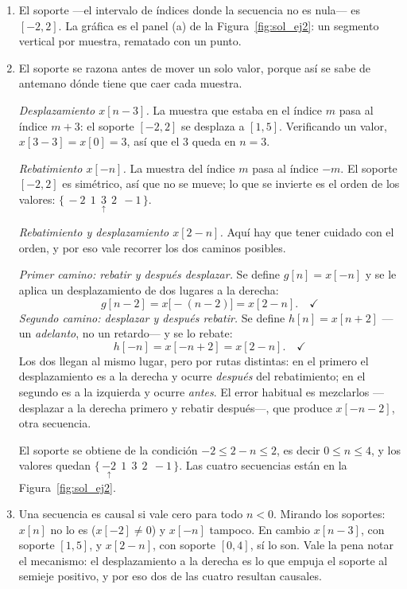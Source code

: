 \documentclass[10pt,a4paper]{article}
\begin{document}
	\begin{enumerate}
		\item El soporte ---el intervalo de índices donde
		la secuencia no es nula--- es $[-2,2]$. La gráfica es el panel (a) de la
		Figura~\ref{fig:sol_ej2}: un segmento vertical por muestra, rematado con un punto.

		\item El soporte se razona antes de mover un solo
		valor, porque así se sabe de antemano dónde tiene que caer cada muestra.

		\emph{Desplazamiento $x[n-3]$.} La muestra que estaba en el índice $m$ pasa al índice
		$m+3$: el soporte $[-2,2]$ se desplaza a $[1,5]$. Verificando un valor,
		$x[3-3]=x[0]=3$, así que el $3$ queda en $n=3$.

		\emph{Rebatimiento $x[-n]$.} La muestra del índice $m$ pasa al índice $-m$. El soporte
		$[-2,2]$ es simétrico, así que no se mueve; lo que se invierte es el orden de
		los valores: $\{\,-2\ \ 1\ \ \underset{\uparrow}{3}\ \ 2\ \ -1\,\}$.

		\emph{Rebatimiento y desplazamiento $x[2-n]$.} Aquí hay que tener cuidado con el
		orden, y por eso vale recorrer los dos caminos posibles.

		\emph{Primer camino: rebatir y después desplazar.} Se define $g[n]=x[-n]$ y se le
		aplica un desplazamiento de dos lugares a la derecha:
		\[
			g[n-2] = x\big[-(n-2)\big] = x[2-n]. \quad\checkmark
		\]
		\emph{Segundo camino: desplazar y después rebatir.} Se define $h[n]=x[n+2]$
		---un \emph{adelanto}, no un retardo--- y se lo rebate:
		\[
			h[-n] = x[-n+2] = x[2-n]. \quad\checkmark
		\]
		Los dos llegan al mismo lugar, pero por rutas distintas: en el primero el
		desplazamiento es a la derecha y ocurre \emph{después} del rebatimiento; en el segundo
		es a la izquierda y ocurre \emph{antes}. El error habitual es mezclarlos ---desplazar a
		la derecha primero y rebatir después---, que produce $x[-n-2]$, otra secuencia.

		El soporte se obtiene de la condición $-2 \leq 2-n \leq 2$, es decir
		$0 \leq n \leq 4$, y los valores quedan
		$\{\,\underset{\uparrow}{-2}\ \ 1\ \ 3\ \ 2\ \ -1\,\}$. Las cuatro secuencias están en
		la Figura~\ref{fig:sol_ej2}.

		\item Una secuencia es causal si vale cero para todo
		$n<0$. Mirando los soportes: $x[n]$ no lo es ($x[-2]\neq0$) y $x[-n]$ tampoco. En
		cambio $x[n-3]$, con soporte $[1,5]$, y $x[2-n]$, con soporte
		$[0,4]$, sí lo son. Vale la pena notar el mecanismo: el desplazamiento a la
		derecha es lo que empuja el soporte al semieje positivo, y por eso dos de las cuatro
		resultan causales.
	\end{enumerate}
\end{document}
